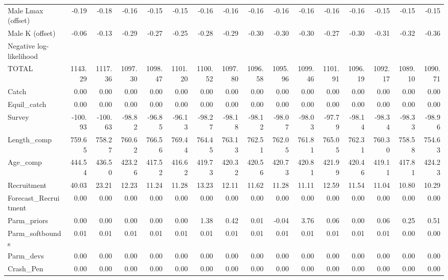 \documentclass[12pt,]{article}
\begin{document}
\begin{landscape}
\begin{table}[ht]
\begin{tabular}{lrrrrrrrrrrrrrrr}
  Male Lmax (offset) & -0.19 & -0.18 & -0.16 & -0.15 & -0.15 & -0.16 & -0.16 & -0.16 & -0.16 & -0.16 & -0.16 & -0.16 & -0.15 & -0.15 & -0.15 \\ 
  Male K (offset) & -0.06 & -0.13 & -0.29 & -0.27 & -0.25 & -0.28 & -0.29 & -0.30 & -0.30 & -0.30 & -0.27 & -0.30 & -0.31 & -0.32 & -0.36 \\ 
  Negative log-likelihood &  &  &  &  &  &  &  &  &  &  &  &  &  &  &  \\ 
  TOTAL & 1143.29 & 1117.36 & 1097.30 & 1098.47 & 1101.20 & 1100.52 & 1097.80 & 1096.58 & 1095.96 & 1099.46 & 1101.91 & 1096.19 & 1092.17 & 1089.10 & 1090.71 \\ 
  Catch & 0.00 & 0.00 & 0.00 & 0.00 & 0.00 & 0.00 & 0.00 & 0.00 & 0.00 & 0.00 & 0.00 & 0.00 & 0.00 & 0.00 & 0.00 \\ 
  Equil\_catch & 0.00 & 0.00 & 0.00 & 0.00 & 0.00 & 0.00 & 0.00 & 0.00 & 0.00 & 0.00 & 0.00 & 0.00 & 0.00 & 0.00 & 0.00 \\ 
  Survey & -100.93 & -100.63 & -98.82 & -96.85 & -96.13 & -98.27 & -98.18 & -98.12 & -98.07 & -98.03 & -97.79 & -98.14 & -98.34 & -98.33 & -98.96 \\ 
  Length\_comp & 759.65 & 758.27 & 760.62 & 766.56 & 769.44 & 764.45 & 763.13 & 762.51 & 762.05 & 761.81 & 765.05 & 762.31 & 760.30 & 758.58 & 754.63 \\ 
  Age\_comp & 444.54 & 436.50 & 423.26 & 417.52 & 416.62 & 419.73 & 420.32 & 420.56 & 420.73 & 420.81 & 421.99 & 420.46 & 419.11 & 417.81 & 424.23 \\ 
  Recruitment & 40.03 & 23.21 & 12.23 & 11.24 & 11.28 & 13.23 & 12.11 & 11.62 & 11.28 & 11.11 & 12.59 & 11.54 & 11.04 & 10.80 & 10.29 \\ 
  Forecast\_Recruitment & 0.00 & 0.00 & 0.00 & 0.00 & 0.00 & 0.00 & 0.00 & 0.00 & 0.00 & 0.00 & 0.00 & 0.00 & 0.00 & 0.00 & 0.00 \\ 
  Parm\_priors & 0.00 & 0.00 & 0.00 & 0.00 & 0.00 & 1.38 & 0.42 & 0.01 & -0.04 & 3.76 & 0.06 & 0.00 & 0.06 & 0.25 & 0.51 \\ 
  Parm\_softbounds & 0.01 & 0.01 & 0.01 & 0.01 & 0.01 & 0.01 & 0.01 & 0.01 & 0.01 & 0.01 & 0.01 & 0.01 & 0.01 & 0.00 & 0.00 \\ 
  Parm\_devs & 0.00 & 0.00 & 0.00 & 0.00 & 0.00 & 0.00 & 0.00 & 0.00 & 0.00 & 0.00 & 0.00 & 0.00 & 0.00 & 0.00 & 0.00 \\ 
  Crash\_Pen & 0.00 & 0.00 & 0.00 & 0.00 & 0.00 & 0.00 & 0.00 & 0.00 & 0.00 & 0.00 & 0.00 & 0.00 & 0.00 & 0.00 & 0.00 \\ 
   \hline
\end{tabular}
\end{table}
\end{landscape}
\end{document}
